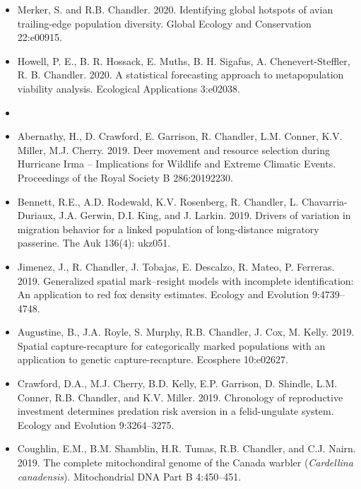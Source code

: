 \begin{itemize}
\item Merker, S. and R.B. Chandler. 2020. Identifying global hotspots
  of avian trailing-edge population diversity. Global Ecology and
  Conservation 22:e00915.   

\item Howell, P. E., B. R. Hossack, E. Muths, B. H. Sigafus,
  A. Chenevert-Steffler, R. B. Chandler. 2020. A statistical 
  forecasting approach to metapopulation viability
  analysis. Ecological Applications 3:e02038. 

  
\item[] { \\}

\item Abernathy, H., D. Crawford, E. Garrison, R. Chandler,
  L.M. Conner, K.V. Miller, M.J. Cherry. 2019. Deer movement and
  resource selection during Hurricane Irma -- Implications for
  Wildlife and Extreme Climatic Events. Proceedings of the Royal
  Society B 286:20192230. 
  
\item Bennett, R.E., A.D. Rodewald, K.V. Rosenberg, R. Chandler,
  L. Chavarria-Duriaux, J.A. Gerwin, D.I. King, and
  J. Larkin. 2019. Drivers of variation in migration behavior for a
  linked population of long-distance migratory passerine. The Auk
  136(4): ukz051.
  
\item Jimenez, J., R. Chandler, J. Tobajas, E. Descalzo, R. Mateo,
  P. Ferreras. 2019. Generalized spatial mark–resight models with
  incomplete identification: An application to red fox density
  estimates. Ecology and Evolution 9:4739--4748. 
  
\item Augustine, B., J.A. Royle, S. Murphy, R.B. Chandler,
  J. Cox, M. Kelly. 2019. Spatial capture-recapture for
  categorically marked populations with an application to genetic
  capture-recapture. Ecosphere 10:e02627.

\item Crawford, D.A., M.J. Cherry, B.D. Kelly, E.P. Garrison,
  D. Shindle, L.M. Conner, R.B. Chandler, and
  K.V. Miller. 2019. Chronology of reproductive investment determines
  predation risk aversion in a felid-ungulate system. Ecology and
  Evolution 9:3264--3275. 

\item Coughlin, E.M., B.M. Shamblin, H.R. Tumas, R.B. Chandler, and
  C.J. Nairn. 2019. The complete mitochondiral genome of the
  Canada warbler ({\it Cardellina canadensis}). Mitochondrial DNA Part
  B 4:450--451.


\end{itemize}
